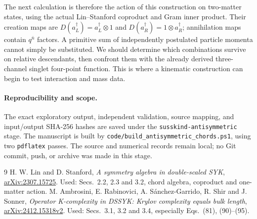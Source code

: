 \documentclass[11pt,a4paper]{article}
\begin{document}
The next calculation is therefore the action of this construction on
two-matter states, using the actual Lin--Stanford coproduct and Gram
inner product. Their creation maps are
$D(a_L^\dagger)=a_L^\dagger\otimes1$ and
$D(a_R^\dagger)=1\otimes a_R^\dagger$; annihilation maps contain
$q^{\bar n}$ factors. A primitive sum of independently postulated
particle momenta cannot simply be substituted. We should determine
which combinations survive on relative descendants, then confront
them with the already derived three-channel singlet four-point
function. This is where a kinematic construction can begin to test
interaction and mass data.

\paragraph{Reproducibility and scope.}
The exact exploratory output, independent validation, source mapping,
and input/output SHA-256 hashes are saved under the
\texttt{susskind-antisymmetric} stage. The manuscript is built by
\texttt{code/build\_antisymmetric\_chords.ps1}, using two
\texttt{pdflatex} passes. The source and numerical records remain
local; no Git commit, push, or archive was made in this stage.

\begin{thebibliography}{9}
 H. W. Lin and D. Stanford,
\emph{A symmetry algebra in double-scaled SYK},
\href{https://arxiv.org/abs/2307.15725}{arXiv:2307.15725}.
Used: Secs.~2.2, 2.3 and 3.2, chord algebra, coproduct and one-matter action.
 M. Ambrosini, E. Rabinovici, A. S\'anchez-Garrido,
R. Shir and J. Sonner,
\emph{Operator K-complexity in DSSYK: Krylov complexity equals bulk length},
\href{https://arxiv.org/abs/2412.15318}{arXiv:2412.15318v2}.
Used: Secs.~3.1, 3.2 and 3.4, especially Eqs.~(81), (90)--(95).
\end{thebibliography}
\end{document}
